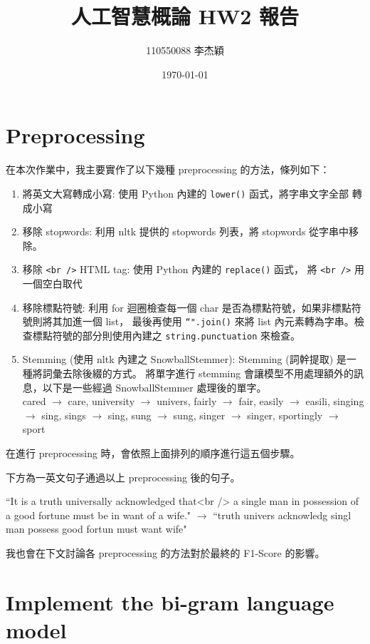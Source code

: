 \documentclass{article}[12pt]
\title{人工智慧概論 HW2 報告}
\author{110550088 李杰穎}
\date{\today}
\begin{document}
\maketitle

\section{Preprocessing}
在本次作業中，我主要實作了以下幾種 preprocessing 的方法，條列如下：
\begin{enumerate}
    \item 將英文大寫轉成小寫: 使用 Python 內建的 \texttt{lower()} 函式，將字串文字全部
    轉成小寫
    \item 移除 stopwords: 利用 nltk 提供的 stopwords 列表，將 stopwords 從字串中移除。
    \item 移除 \texttt{<br />} HTML tag: 使用 Python 內建的 \texttt{replace()} 函式，
    將 \texttt{<br />} 用一個空白取代
    \item 移除標點符號: 利用 for 迴圈檢查每一個 char 是否為標點符號，如果非標點符號則將其加進一個 list，
    最後再使用 \texttt{``".join()} 來將 list 內元素轉為字串。檢查標點符號的部分則使用內建之
    \texttt{string.punctuation} 來檢查。
    \item Stemming (使用 nltk 內建之 SnowballStemmer): Stemming (詞幹提取) 是一種將詞彙去除後綴的方式。
    將單字進行 stemming 會讓模型不用處理額外的訊息，以下是一些經過 SnowballStemmer 處理後的單字。\\
    cared $\rightarrow$         care, 
    university $\rightarrow$     univers, 
    fairly $\rightarrow$         fair, 
    easily $\rightarrow$         easili,
    singing $\rightarrow$       sing, 
    sings $\rightarrow$         sing,  
    sung  $\rightarrow$          sung,  
    singer $\rightarrow$        singer,  
    sportingly $\rightarrow$     sport
\end{enumerate}

在進行 preprocessing 時，會依照上面排列的順序進行這五個步驟。

下方為一英文句子通過以上 preprocessing 後的句子。

\small{``It is a truth universally acknowledged that<br /> 
a single man in possession of a good fortune must be in want of a wife." $\rightarrow$
``truth univers acknowledg singl man possess good fortun must want wife"}

我也會在下文討論各 preprocessing 的方法對於最終的 F1-Score 的影響。

\section{Implement the bi-gram language model}
\end{document}
